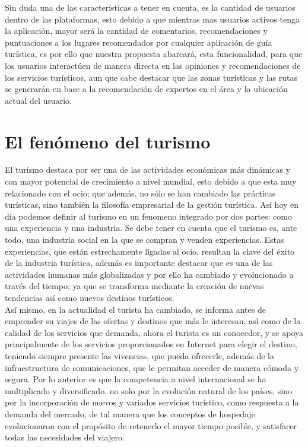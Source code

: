 Sin duda una de las características a tener en cuenta, es la cantidad de usuarios dentro de las plataformas, esto debido a que mientras mas usuarios activos tenga la aplicación, mayor será la cantidad de comentarios, recomendaciones y puntuaciones a los lugares recomendados por cualquier aplicación de guía turística, es por ello que nuestra propuesta abarcará, esta funcionalidad, para que los usuarios interactúen de manera directa en las opiniones y recomendaciones de los servicios turísticos, aun que cabe destacar que las zonas turísticas y las rutas se generarán en base a la recomendación de expertos en el área y la ubicación actual del usuario. \\

\section{El fenómeno del turismo}

El turísmo destaca por ser una de las actividades económicas más dinámicas y con mayor potencial de crecimiento a nivel mundial, esto debido a que esta muy relacionado con el ocio; que además, no sólo se han cambiado las prácticas turísticas, sino también la filosofía empresarial de la gestión turística. Así hoy en día podemos definir al turismo en un fenomeno integrado por dos partes: como una experiencia y una industria. Se debe tener en cuenta que el turismo es, ante todo, una industria social en la que se compran y venden experiencias. Estas experiencias, que están estrechamente ligadas al ocio, resultan la clave del éxito de la industria turística, además es importante destacar que es una de las actividades humanas más globalizadas y por ello ha cambiado y evolucionado a través del tiempo; ya que se transforma mediante la creación de nuevas tendencias así como nuevos destinos turísticos\cite{fenom}.\\

Así mismo, en la actualidad el turista ha cambiado, se informa antes de emprender su viajes de las ofertas y destinos que más le interesan, así como de la calidad de los servicios que demanda, ahora el turista es un conocedor, y se apoya principalmente de los servicios proporcionados en Internet para elegir el destino, teniendo siempre presente las vivencias, que pueda ofrecerle, además de la infraestructura de comunicaciones, que le permitan acceder de manera cómoda y segura. Por lo anterior es que la competencia a nivel internacional se ha multiplicado y diversificado, no solo por la evolución natural de los países, sino por la incorporación de nuevos y variados servicios turístico, como respuesta a la demanda del mercado, de tal manera que los conceptos de hospedaje evolucionaron con el propósito de retenerlo el mayor tiempo posible, y satisfacer todas las necesidades del viajero\cite{fenom}.